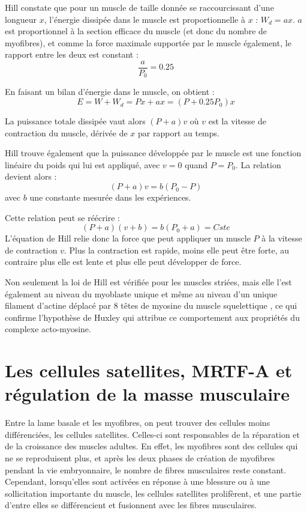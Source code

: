 Hill constate que pour un muscle de taille donnée se raccourcissant d'une longueur $x$, l'énergie dissipée dans le muscle est proportionnelle à $x$ : $W_d=ax$. $a$ est proportionnel à la section efficace du muscle (et donc du nombre de myofibres), et comme la force maximale supportée par le muscle également, le rapport entre les deux  est constant : $$\frac{a}{P_0}=0.25$$

En faisant un bilan d'énergie dans le muscle, on obtient : 
$$ E=W+W_d=Px+ax=(P+0.25P_0)x$$

La puissance totale dissipée vaut alors $(P+a)v$ où $v$ est la vitesse de contraction du muscle, dérivée de $x$ par rapport au temps. 

Hill trouve également que la puissance développée par le muscle est une fonction linéaire du poids qui lui est appliqué, avec $v=0$ quand $P=P_0$. 
La relation devient alors : 
$$ (P+a)v=b(P_0-P)$$
avec $b$ une constante mesurée dans les expériences. 

Cette relation peut se réécrire : 
\begin{equation}
\label{Hill}
(P+a)(v+b)=b(P_0+a)=Cste
\end{equation}
L'équation de Hill relie donc la force que peut appliquer un muscle $P$ à la vitesse de contraction $v$. Plus la contraction est rapide, moins elle peut être forte, au contraire plus elle est lente et plus elle peut développer de force. 

Non seulement la loi de Hill est vérifiée pour les muscles striées, mais elle l'est également au niveau du myoblaste unique \cite{Mitrossilis} et même au niveau d'un unique filament d'actine déplacé par 8 têtes de myosine du muscle squelettique \cite{Debold}, ce qui confirme l'hypothèse de Huxley \cite{Huxley} qui attribue ce comportement aux propriétés du complexe acto-myosine. 

\section{Les cellules satellites, MRTF-A et régulation de la masse musculaire}
Entre la lame basale et les myofibres, on peut trouver des cellules moins différenciées, les cellules satellites. Celles-ci sont responsables de la réparation et de la croissance des muscles adultes. 
En effet, les myofibres sont des cellules qui ne se reproduisent plus, et après les deux phases de création de myofibres pendant la vie embryonnaire, le nombre de fibres musculaires reste constant. 
Cependant, lorsqu'elles sont activées en réponse à une blessure ou à une sollicitation importante du muscle, les cellules satellites prolifèrent, et une partie d'entre elles se différencient et fusionnent avec les fibres musculaires. 

